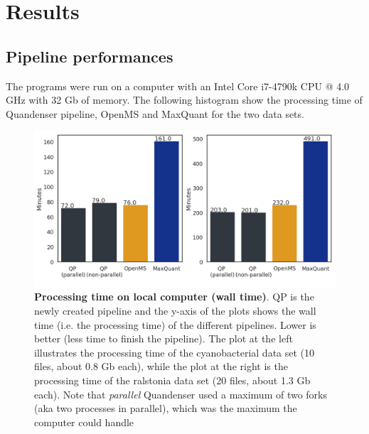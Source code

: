 \section{Results}

\subsection{Pipeline performances}

The programs were run on a computer with an Intel Core i7-4790k CPU @ 4.0 GHz with 32 Gb of memory. The following histogram show the processing time of Quandenser pipeline, OpenMS and MaxQuant for the two data sets.

\begin{figure}[H]
  \includegraphics[width=\linewidth]{results/times.png}
  \caption{\textbf{Processing time on local computer (wall time)}. QP is the newly created pipeline and the y-axis of the plots shows the wall time (i.e. the processing time) of the different pipelines. Lower is better (less time to finish the pipeline). The plot at the left illustrates the processing time of the cyanobacterial data set (10 files, about 0.8 Gb each), while the plot at the right is the processing time of the ralstonia data set (20 files, about 1.3 Gb each). Note that \textit{parallel} Quandenser used a maximum of two forks (aka two processes in parallel), which was the maximum the computer could handle}
  \label{fig:processing-local}
\end{figure}

